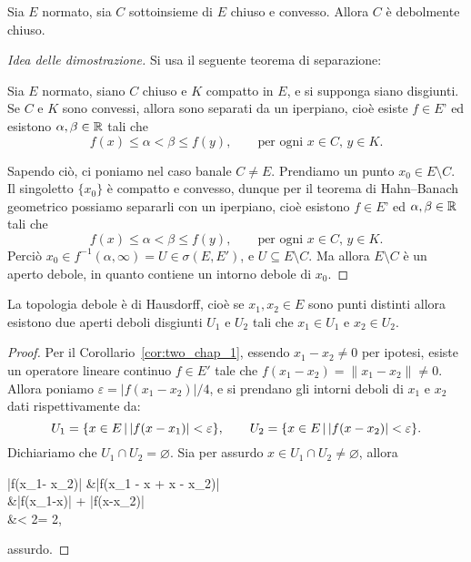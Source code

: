 \begin{theorem}
	Sia $E$ normato, sia $C$ sottoinsieme di $E$ chiuso e convesso.
	Allora $C$ è debolmente chiuso.
\end{theorem}
\begin{proof}[Idea delle dimostrazione]
	Si usa il seguente teorema di separazione:
	\begin{theorem}
	\label{th:geom_hahn_banach}
		Sia $E$ normato, siano $C$ chiuso e $K$ compatto in $E$, e si supponga siano disgiunti.
		Se $C$ e $K$ sono convessi, allora sono separati da un iperpiano, cioè esiste $f \in E$' ed esistono $\alpha, \beta \in \mathbb{R}$ tali che
		\begin{equation*}
			f(x) \leq \alpha < \beta \leq f(y), \qquad \text{per ogni $x \in C$, $y \in K$.}
		\end{equation*}
	\end{theorem}
	Sapendo ciò, ci poniamo nel caso banale $C \neq E$. Prendiamo un punto $x_0 \in E \setminus C$. Il singoletto $\{x_0\}$ è compatto e convesso, dunque per il teorema di Hahn--Banach geometrico possiamo separarli con un iperpiano, cioè esistono $f \in E$' ed $\alpha, \beta \in \mathbb{R}$ tali che
	\begin{equation*}
		f(x) \leq \alpha < \beta \leq f(y), \qquad \text{per ogni $x \in C$, $y \in K$.}
	\end{equation*}
	Perciò $x_0 \in f^{-1}(\alpha, \infty) = U \in \sigma(E, E')$, e $U \subseteq E \setminus C$. Ma allora $E \setminus C$ è un aperto debole, in quanto contiene un intorno debole di $x_0$.
\end{proof}

\begin{lemma}
	La topologia debole è di Hausdorff, cioè se $x_1, x_2 \in E$ sono punti distinti allora esistono due aperti deboli disgiunti $U_1$ e $U_2$ tali che $x_1 \in U_1$ e $x_2 \in U_2$.
\end{lemma}
\begin{proof}
	Per il Corollario~\ref{cor:two_chap_1}, essendo $x_1 - x_2 \neq 0$ per ipotesi, esiste un operatore lineare continuo $f \in E'$ tale che $f(x_1 - x_2) = \|x_1 - x_2\| \neq 0$. Allora poniamo $\varepsilon = |f(x_1-x_2)|/4$, e si prendano gli intorni deboli di $x_1$ e $x_2$ dati rispettivamente da:
	\begin{equation*}
		U_1 = \{x \in E \,|\, |f(x-x_1)| < \varepsilon \}, \qquad U_2 = \{x \in E \,|\, |f(x-x_2)| < \varepsilon \}.
	\end{equation*}
	Dichiariamo che $U_1 \cap U_2 = \varnothing$. Sia per assurdo $x \in U_1 \cap U_2 \neq \varnothing$, allora
	\begin{eqalign*}
		|f(x_1- x_2)| &\leq |f(x_1 - x + x - x_2)|\\
		&\leq |f(x_1-x)| + |f(x-x_2)|\\
		&< 2\varepsilon = 2,
	\end{eqalign*}
	assurdo.
\end{proof}

